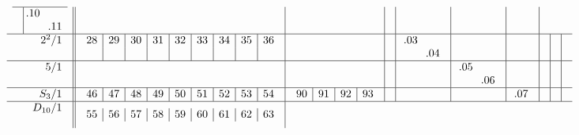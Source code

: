 \documentclass[12pt,a4paper]{amsart}
\begin{document}
\begin{align*}
\begin{array}{r||c|c|c|c|c|c|c|c|c}
\begin{array}{c|cc}
\hline
&\llap.10&\\
&&\llap.11\\
    \end{array}
&&&&&& \\\hline
    \begin{array}{r}
      2^2/1 \\ \\
    \end{array}
&
  \begin{array}{c|c|c|c|c|c|c|c|c}
    28&29&30&31&32&33&34&35&36\\
    &&&&&&&&\\
  \end{array}
&&&
    \begin{array}{cc}
\llap.03&\\
&\llap.04\\
    \end{array}
&&&&& \\\hline
    \begin{array}{r}
      5/1 \\ \\
    \end{array}
&&&&&
    \begin{array}{cc}
\llap.05&\\
&\llap.06\\
    \end{array}
&&&& \\\hline
    \begin{array}{r}
      S_3/1 \\
    \end{array}
&
  \begin{array}{c|c|c|c|c|c|c|c|c}
    46&47&48&49&50&51&52&53&54\\
  \end{array}
&
   \begin{array}{c|c|c|c}
90&91&92&93\\
   \end{array}
&&&&
    \begin{array}{c}
\llap.07\\
    \end{array}
&&& \\\hline
    \begin{array}{r}
      D_{10}/1 \\ \\
    \end{array}
&
  \begin{array}{c|c|c|c|c|c|c|c|c}
55&56&57&58&59&60&61&62&63\\

\end{array}
\end{array}
\end{align*}
\end{document}
